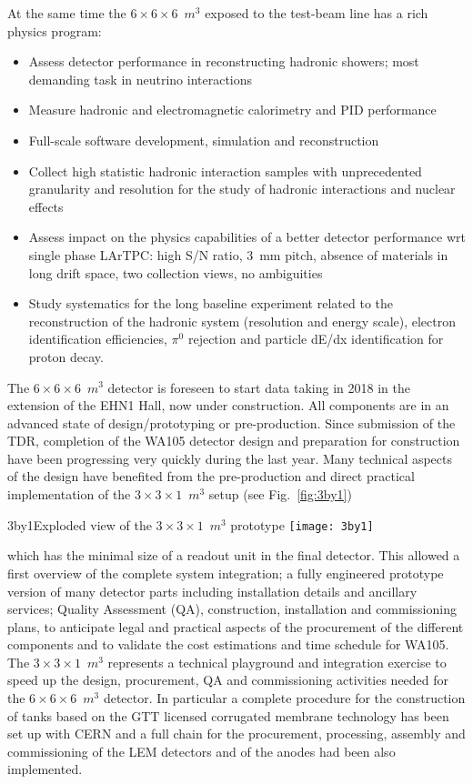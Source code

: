 At the same time the $6\times 6\times 6$~$m^3$ exposed to the test-beam line has a rich physics program:
\begin{itemize}
\item{Assess detector performance in reconstructing hadronic
  showers; most demanding task in neutrino interactions}
\item{ Measure hadronic and electromagnetic calorimetry and PID performance}
\item{Full-scale software development, simulation and reconstruction}
\item{Collect high statistic hadronic interaction samples with
  unprecedented granularity and resolution for the study of hadronic
  interactions and nuclear effects}
\item{Assess impact on the physics capabilities of a better
  detector performance wrt single phase LArTPC: high S/N ratio, 3~mm
  pitch, absence of materials in long drift space, two collection
  views, no ambiguities}
\item{Study systematics for the long baseline experiment
  related to the reconstruction of the hadronic system (resolution and
  energy scale), electron identification efficiencies, $\pi^0$
  rejection and particle dE/dx identification for proton decay.}
\end{itemize}

The $6\times 6\times 6$~$m^3$ detector is foreseen to start data
taking in 2018 in the extension of the EHN1 Hall, now under
construction. All components are in an advanced state of
design/prototyping or pre-production. Since submission of the TDR,
completion of the WA105 detector design and preparation for
construction have been progressing very quickly during the last
year. Many technical aspects of the design have benefited from the
pre-production and direct practical implementation of the $3 \times 3
\times 1$~$m^3$ setup (see Fig.~\ref{fig:3by1})
\begin{cdrfigure}
{3by1}{Exploded view of the  $3\times 3\times 1$~$m^3$  prototype}
\texttt{[image: 3by1]}
\end{cdrfigure}
which has the minimal size of a readout unit in the final detector.
This allowed a first overview of the complete system integration; a
fully engineered prototype version of many detector parts including
installation details and ancillary services; Quality Assessment (QA),
construction, installation and commissioning plans, to anticipate
legal and practical aspects of the procurement of the different
components and to validate the cost estimations and time schedule for
WA105.  The $3 \times 3 \times 1$~$m^3$ represents a technical
playground and integration exercise to speed up the design,
procurement, QA and commissioning activities needed for the $6\times
6\times 6$~$m^3$ detector.  In particular a complete procedure for the
construction of tanks based on the GTT licensed corrugated membrane
technology has been set up with CERN and a full chain for the
procurement, processing, assembly and commissioning of the LEM
detectors and of the anodes had been also implemented.

